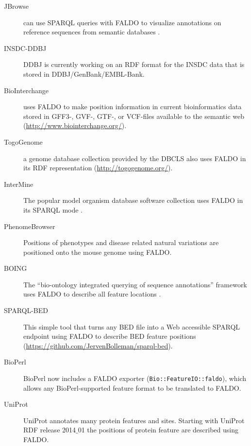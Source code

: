 \begin{description}
\item[JBrowse] can use SPARQL queries with FALDO to visualize annotations on reference sequences from semantic databases \cite{JBrowse}.
\item[INSDC-DDBJ] DDBJ is currently working on an RDF format for the INSDC data that is stored in DDBJ/GenBank/EMBL-Bank.
\item[BioInterchange] uses FALDO to make position information in current bioinformatics data stored in GFF3-, GVF-, GTF-, or VCF-files available to the semantic web (\url{http://www.biointerchange.org/}).
\item[TogoGenome] a genome database collection provided by the DBCLS also uses FALDO in its RDF representation (\url{http://togogenome.org/}).
\item[InterMine] The popular model organism database software collection uses FALDO in its SPARQL mode \cite{InterMine}.
\item[PhenomeBrowser] Positions of phenotypes and disease related natural variations are positioned onto the mouse genome using FALDO.
\item[BOING] The ``bio-ontology integrated querying of sequence annotations'' framework uses FALDO to describe all feature locations \cite{BOING}.
\item[SPARQL-BED] This simple tool that turns any BED file into a Web accessible SPARQL endpoint using FALDO to describe BED feature positions (\url{https://github.com/JervenBolleman/sparql-bed}).
\item[BioPerl] BioPerl\cite{BioPerl2002} now includes a FALDO exporter (\texttt{Bio::FeatureIO::faldo}), which allows any BioPerl-supported feature format to be translated to FALDO.
\item[UniProt] UniProt annotates many protein features and sites. Starting with UniProt RDF release 2014$\_$01 the positions of protein feature are described using FALDO.
\end{description}

